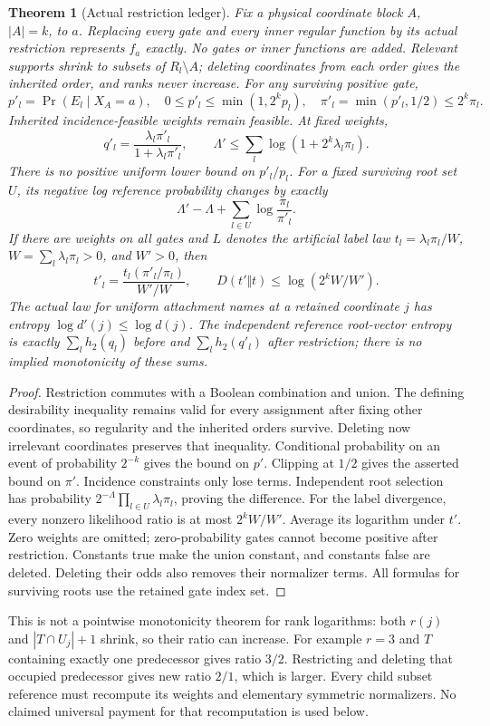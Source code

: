 \documentclass{article}
\newtheorem{theorem}{Theorem}
\begin{document}
\begin{theorem}[Actual restriction ledger]
Fix a physical coordinate block $A$, $|A|=k$, to $a$. Replacing every
gate and every inner regular function by its actual restriction represents
$f_a$ exactly. No gates or inner functions are added. Relevant supports
shrink to subsets of $R_l\setminus A$; deleting coordinates from each
order gives the inherited order, and ranks never increase.
For any surviving positive gate,
\[
 p'_l=\Pr(E_l\mid X_A=a),\quad 0\le p'_l\le\min(1,2^kp_l),\quad
 \pi'_l=\min(p'_l,1/2)\le2^k\pi_l.
\]
Inherited incidence-feasible weights remain feasible. At fixed weights,
\[
 q'_l=\frac{\lambda_l\pi'_l}{1+\lambda_l\pi'_l},\qquad
 \Lambda'\le\sum_l\log(1+2^k\lambda_l\pi_l).
\]
There is no positive uniform lower bound on $p'_l/p_l$.
For a fixed surviving root set $U$, its negative log reference probability
changes by exactly
\[
 \Lambda'-\Lambda+\sum_{l\in U}\log\frac{\pi_l}{\pi'_l}.
\]
If there are weights on all gates and $L$ denotes the artificial label law
$t_l=\lambda_l\pi_l/W$, $W=\sum_l\lambda_l\pi_l>0$, and $W'>0$, then
\[
 t'_l=\frac{t_l(\pi'_l/\pi_l)}{W'/W},\qquad
 D(t'\Vert t)\le\log(2^kW/W').
\]
The actual law for uniform attachment names at a retained coordinate $j$
has entropy $\log d'(j)\le\log d(j)$.
The independent reference root-vector entropy is exactly
$\sum_l h_2(q_l)$ before and $\sum_l h_2(q'_l)$ after restriction;
there is no implied monotonicity of these sums.
\end{theorem}
\begin{proof}
Restriction commutes with a Boolean combination and union. The defining
desirability inequality remains valid for every assignment after fixing
other coordinates, so regularity and the inherited orders survive.
Deleting now irrelevant coordinates preserves that inequality. Conditional
probability on an event of probability $2^{-k}$ gives the bound on $p'$.
Clipping at $1/2$ gives the asserted bound on $\pi'$. Incidence constraints
only lose terms. Independent root selection has probability
$2^{-\Lambda}\prod_{l\in U}\lambda_l\pi_l$, proving the difference.
For the label divergence, every nonzero likelihood ratio is at most
$2^kW/W'$. Average its logarithm under $t'$. Zero weights are omitted;
zero-probability gates cannot become positive after restriction.
Constants true make the union constant, and constants false are deleted.
Deleting their odds also removes their normalizer terms. All formulas for
surviving roots use the retained gate index set.
\end{proof}
This is not a pointwise monotonicity theorem for rank logarithms:
both $r(j)$ and $|T\cap U_j|+1$ shrink, so their ratio can increase.
For example $r=3$ and $T$ containing exactly one predecessor gives ratio
$3/2$. Restricting and deleting that occupied predecessor gives new ratio
$2/1$, which is larger. Every child subset reference must recompute
its weights and elementary symmetric normalizers. No claimed universal
payment for that recomputation is used below.
\end{document}

